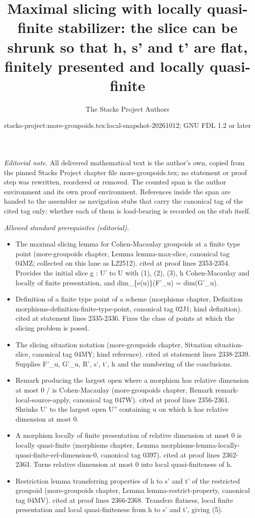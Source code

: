 \documentclass{stacks-project}
\title{Maximal slicing with locally quasi-finite stabilizer: the slice can be shrunk so that h, s' and t' are flat, finitely presented and locally quasi-finite}
\author{The Stacks Project Authors}
\date{stacks-project:more-groupoids.tex:local-snapshot-20261012; GNU FDL 1.2 or later}
\theoremstyle{plain}
\theoremstyle{definition}
\theoremstyle{remark}
\numberwithin{equation}{subsection}
\begin{document}
\maketitle
\setcounter{subsection}{1}
\noindent\textit{Editorial note.} All delivered mathematical text is the author's own, copied from the pinned Stacks Project chapter file more-groupoids.tex; no statement or proof step was rewritten, reordered or removed. The counted span is the author environment and its own proof environment. References inside the span are handed to the assembler as navigation stubs that carry the canonical tag of the cited tag only; whether each of them is load-bearing is recorded on the stub itself.\par\medskip
\noindent\textit{Allowed standard prerequisites (editorial).}\begin{itemize}
\item The maximal slicing lemma for Cohen-Macaulay groupoids at a finite type point (more-groupoids chapter, Lemma lemma-max-slice, canonical tag 04MZ; collected on this lane as L22512). cited at proof lines 2353-2354. Provides the initial slice g : U' to U with (1), (2), (3), h Cohen-Macaulay and locally of finite presentation, and dim\_\{e(u)\}(F'\_u) = dim(G'\_u).
\item Definition of a finite type point of a scheme (morphisms chapter, Definition morphisms-definition-finite-type-point, canonical tag 02J1; kind definition). cited at statement lines 2335-2336. Fixes the class of points at which the slicing problem is posed.
\item The slicing situation notation (more-groupoids chapter, Situation situation-slice, canonical tag 04MY; kind reference). cited at statement lines 2338-2339. Supplies F'\_u, G'\_u, R', s', t', h and the numbering of the conclusions.
\item Remark producing the largest open where a morphism has relative dimension at most 0 / is Cohen-Macaulay (more-groupoids chapter, Remark remark-local-source-apply, canonical tag 047W). cited at proof lines 2356-2361. Shrinks U' to the largest open U'' containing u on which h has relative dimension at most 0.
\item A morphism locally of finite presentation of relative dimension at most 0 is locally quasi-finite (morphisms chapter, Lemma morphisms-lemma-locally-quasi-finite-rel-dimension-0, canonical tag 0397). cited at proof lines 2362-2363. Turns relative dimension at most 0 into local quasi-finiteness of h.
\item Restriction lemma transferring properties of h to s' and t' of the restricted groupoid (more-groupoids chapter, Lemma lemma-restrict-property, canonical tag 04MV). cited at proof lines 2366-2368. Transfers flatness, local finite presentation and local quasi-finiteness from h to s' and t', giving (5).
\end{itemize}\medskip
\end{document}
